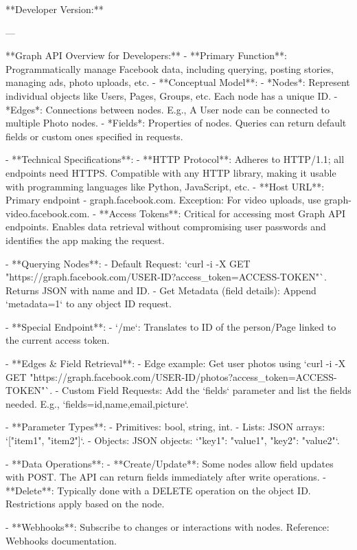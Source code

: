 **Developer Version:**

---

**Graph API Overview for Developers:**
- **Primary Function**: Programmatically manage Facebook data, including querying, posting stories, managing ads, photo uploads, etc.
- **Conceptual Model**: 
  - *Nodes*: Represent individual objects like Users, Pages, Groups, etc. Each node has a unique ID.
  - *Edges*: Connections between nodes. E.g., A User node can be connected to multiple Photo nodes.
  - *Fields*: Properties of nodes. Queries can return default fields or custom ones specified in requests.

- **Technical Specifications**:
  - **HTTP Protocol**: Adheres to HTTP/1.1; all endpoints need HTTPS. Compatible with any HTTP library, making it usable with programming languages like Python, JavaScript, etc.
  - **Host URL**: Primary endpoint - graph.facebook.com. Exception: For video uploads, use graph-video.facebook.com.
  - **Access Tokens**: Critical for accessing most Graph API endpoints. Enables data retrieval without compromising user passwords and identifies the app making the request.

- **Querying Nodes**:
  - Default Request: `curl -i -X GET "https://graph.facebook.com/USER-ID?access_token=ACCESS-TOKEN"`. Returns JSON with name and ID.
  - Get Metadata (field details): Append `metadata=1` to any object ID request.
  
- **Special Endpoint**:
  - `/me`: Translates to ID of the person/Page linked to the current access token.

- **Edges & Field Retrieval**:
  - Edge example: Get user photos using `curl -i -X GET "https://graph.facebook.com/USER-ID/photos?access_token=ACCESS-TOKEN"`.
  - Custom Field Requests: Add the `fields` parameter and list the fields needed. E.g., `fields=id,name,email,picture`.

- **Parameter Types**:
  - Primitives: bool, string, int.
  - Lists: JSON arrays: `["item1", "item2"]`.
  - Objects: JSON objects: `{"key1": "value1", "key2": "value2"}`.

- **Data Operations**:
  - **Create/Update**: Some nodes allow field updates with POST. The API can return fields immediately after write operations.
  - **Delete**: Typically done with a DELETE operation on the object ID. Restrictions apply based on the node.

- **Webhooks**: Subscribe to changes or interactions with nodes. Reference: Webhooks documentation.
  
